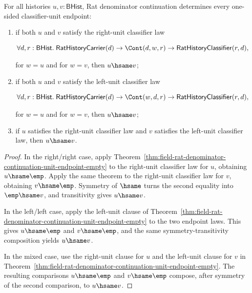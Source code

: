 \begin{theorem}
\label{thm:field-rat-denominator-continuation-unit-endpoint-unique}
For all histories $u,v:\mathsf{BHist}$, Rat denominator continuation determines
every one-sided classifier-unit endpoint:
\begin{enumerate}
  \item if both $u$ and $v$ satisfy the right-unit classifier law

  $$
  \forall d,r:\mathsf{BHist}.\;
  \mathsf{RatHistoryCarrier}(d)\to
  \Cont(d,w,r)\to
  \mathsf{RatHistoryClassifier}(r,d),
  $$

  for $w=u$ and for $w=v$, then $u\hsame v$;
  \item if both $u$ and $v$ satisfy the left-unit classifier law

  $$
  \forall d,r:\mathsf{BHist}.\;
  \mathsf{RatHistoryCarrier}(d)\to
  \Cont(w,d,r)\to
  \mathsf{RatHistoryClassifier}(r,d),
  $$

  for $w=u$ and for $w=v$, then $u\hsame v$;
  \item if $u$ satisfies the right-unit classifier law and $v$ satisfies the
  left-unit classifier law, then $u\hsame v$.
\end{enumerate}
\end{theorem}
\begin{proof}
In the right/right case, apply
Theorem~\ref{thm:field-rat-denominator-continuation-unit-endpoint-empty} to the
right-unit classifier law for $u$, obtaining $u\hsame\emp$. Apply the same
theorem to the right-unit classifier law for $v$, obtaining $v\hsame\emp$.
Symmetry of $\hsame$ turns the second equality into $\emp\hsame v$, and
transitivity gives $u\hsame v$.

In the left/left case, apply the left-unit clause of
Theorem~\ref{thm:field-rat-denominator-continuation-unit-endpoint-empty} to the
two endpoint laws. This gives $u\hsame\emp$ and $v\hsame\emp$, and the same
symmetry-transitivity composition yields $u\hsame v$.

In the mixed case, use the right-unit clause for $u$ and the left-unit clause
for $v$ in
Theorem~\ref{thm:field-rat-denominator-continuation-unit-endpoint-empty}. The
resulting comparisons $u\hsame\emp$ and $v\hsame\emp$ compose, after symmetry
of the second comparison, to $u\hsame v$.
\end{proof}

